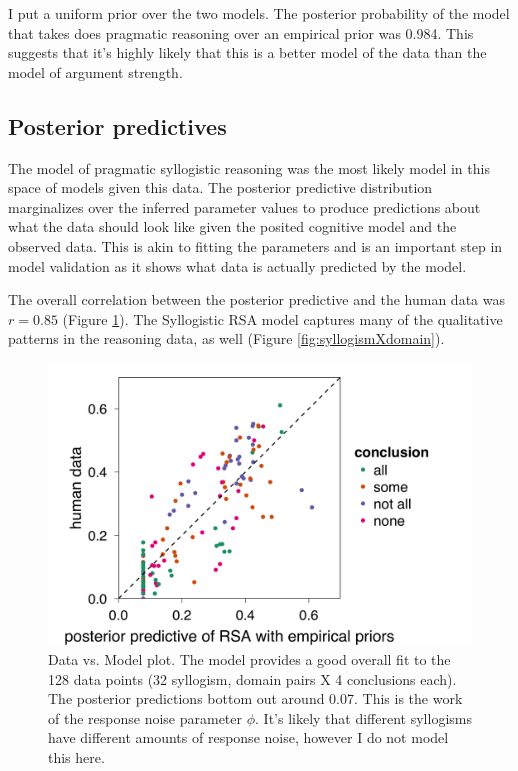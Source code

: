 \documentclass{llncs} %
\begin{document}
I put a uniform prior over the two models. The posterior probability of the model that takes does pragmatic reasoning over an empirical prior was 0.984. This suggests that it's highly likely that this is a better model of the data than the model of argument strength. 

\subsection{Posterior predictives}

The model of pragmatic syllogistic reasoning was the most likely model in this space of models given this data. The posterior predictive distribution marginalizes over the inferred parameter values to produce predictions about what the data should look like given the posited cognitive model and the observed data. This is akin to fitting the parameters and is an important step in model validation as it shows what data is actually predicted by the model.

The overall correlation between the posterior predictive and the human data was $r = 0.85$ (Figure \ref{fig:scatterplot}). The Syllogistic RSA model captures many of the qualitative patterns in the reasoning data, as well (Figure \ref{fig:syllogismXdomain}). 

\begin{figure}
\centering
    \includegraphics[width=0.5\columnwidth]{figures/scatterplot}
    \caption{Data vs. Model plot. The model provides a good overall fit to the 128 data points (32 syllogism, domain pairs X 4 conclusions each). The posterior predictions bottom out around 0.07. This is the work of the response noise parameter $\phi$. It's likely that different syllogisms have different amounts of response noise, however I do not model this here.}
  \label{fig:scatterplot}
\end{figure}
\end{document}
